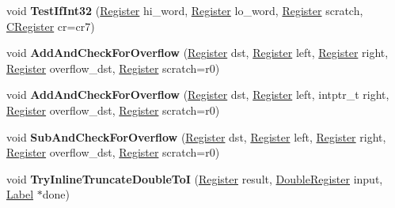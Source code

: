 \begin{DoxyCompactItemize}
void {\bfseries Test\+If\+Int32} (\mbox{\hyperlink{classv8_1_1internal_1_1Register}{Register}} hi\+\_\+word, \mbox{\hyperlink{classv8_1_1internal_1_1Register}{Register}} lo\+\_\+word, \mbox{\hyperlink{classv8_1_1internal_1_1Register}{Register}} scratch, \mbox{\hyperlink{classv8_1_1internal_1_1CRegister}{C\+Register}} cr=cr7)
\item 
\mbox{\label{classv8_1_1internal_1_1TurboAssembler_aef09d9c342ca389bf7a5eb137ef97437}} 
void {\bfseries Add\+And\+Check\+For\+Overflow} (\mbox{\hyperlink{classv8_1_1internal_1_1Register}{Register}} dst, \mbox{\hyperlink{classv8_1_1internal_1_1Register}{Register}} left, \mbox{\hyperlink{classv8_1_1internal_1_1Register}{Register}} right, \mbox{\hyperlink{classv8_1_1internal_1_1Register}{Register}} overflow\+\_\+dst, \mbox{\hyperlink{classv8_1_1internal_1_1Register}{Register}} scratch=r0)
\item 
\mbox{\label{classv8_1_1internal_1_1TurboAssembler_a63cc3c959a4eea53c84cc529d2352890}} 
void {\bfseries Add\+And\+Check\+For\+Overflow} (\mbox{\hyperlink{classv8_1_1internal_1_1Register}{Register}} dst, \mbox{\hyperlink{classv8_1_1internal_1_1Register}{Register}} left, intptr\+\_\+t right, \mbox{\hyperlink{classv8_1_1internal_1_1Register}{Register}} overflow\+\_\+dst, \mbox{\hyperlink{classv8_1_1internal_1_1Register}{Register}} scratch=r0)
\item 
\mbox{\label{classv8_1_1internal_1_1TurboAssembler_a4bac6277122cbf0a9dfe7752b832568f}} 
void {\bfseries Sub\+And\+Check\+For\+Overflow} (\mbox{\hyperlink{classv8_1_1internal_1_1Register}{Register}} dst, \mbox{\hyperlink{classv8_1_1internal_1_1Register}{Register}} left, \mbox{\hyperlink{classv8_1_1internal_1_1Register}{Register}} right, \mbox{\hyperlink{classv8_1_1internal_1_1Register}{Register}} overflow\+\_\+dst, \mbox{\hyperlink{classv8_1_1internal_1_1Register}{Register}} scratch=r0)
\item 
\mbox{\label{classv8_1_1internal_1_1TurboAssembler_af3946cf74055fd4ca6bfe32c5b1feef2}} 
void {\bfseries Try\+Inline\+Truncate\+Double\+ToI} (\mbox{\hyperlink{classv8_1_1internal_1_1Register}{Register}} result, \mbox{\hyperlink{classv8_1_1internal_1_1DoubleRegister}{Double\+Register}} input, \mbox{\hyperlink{classv8_1_1internal_1_1Label}{Label}} $\ast$done)

\end{DoxyCompactItemize}
